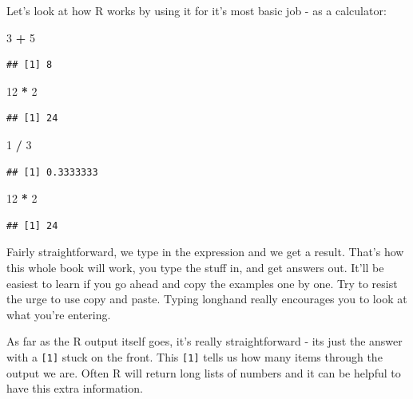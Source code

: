 \documentclass[
]{book}
\newenvironment{Shaded}{\begin{snugshade}}{\end{snugshade}}
\newcommand{\DecValTok}[1]{\textcolor[rgb]{0.00,0.00,0.81}{#1}}
\newcommand{\OperatorTok}[1]{\textcolor[rgb]{0.81,0.36,0.00}{\textbf{#1}}}
\newcommand{\StringTok}[1]{\textcolor[rgb]{0.31,0.60,0.02}{#1}}
\begin{document}
Let's look at how R works by using it for it's most basic job - as a calculator:

\begin{Shaded}
\begin{Highlighting}[]
 \DecValTok{3} \OperatorTok{+}\StringTok{ }\DecValTok{5}
\end{Highlighting}
\end{Shaded}

\begin{verbatim}
## [1] 8
\end{verbatim}

\begin{Shaded}
\begin{Highlighting}[]
 \DecValTok{12} \OperatorTok{*}\StringTok{ }\DecValTok{2}
\end{Highlighting}
\end{Shaded}

\begin{verbatim}
## [1] 24
\end{verbatim}

\begin{Shaded}
\begin{Highlighting}[]
 \DecValTok{1} \OperatorTok{/}\StringTok{ }\DecValTok{3}
\end{Highlighting}
\end{Shaded}

\begin{verbatim}
## [1] 0.3333333
\end{verbatim}

\begin{Shaded}
\begin{Highlighting}[]
 \DecValTok{12} \OperatorTok{*}\StringTok{ }\DecValTok{2}
\end{Highlighting}
\end{Shaded}

\begin{verbatim}
## [1] 24
\end{verbatim}

Fairly straightforward, we type in the expression and we get a result. That's how this whole book will work, you type the stuff in, and get answers out. It'll be easiest to learn if you go ahead and copy the examples one by one. Try to resist the urge to use copy and paste. Typing longhand really encourages you to look at what you're entering.

As far as the R output itself goes, it's really straightforward - its just the answer with a \texttt{{[}1{]}} stuck on the front. This \texttt{{[}1{]}} tells us how many items through the output we are. Often R will return long lists of numbers and it can be helpful to have this extra information.
\end{document}
